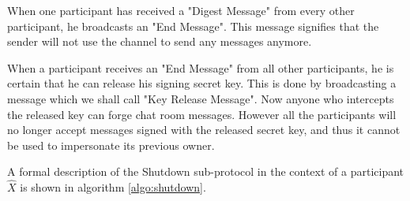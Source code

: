 When one participant has received a "Digest Message" from every other participant, he broadcasts an "End Message". This message signifies that the sender will not use the channel to send any messages anymore.

When a participant receives an "End Message" from all other participants, he is certain that he can release his signing secret key. This is done by broadcasting a message which we shall call "Key Release Message". Now anyone who intercepts the released key can forge chat room messages. However all the participants will no longer accept messages signed with the released secret key, and thus it cannot be used to impersonate its previous owner.

A formal description of the Shutdown sub-protocol in the context of a participant $\hat{X}$ is shown in algorithm \ref{algo:shutdown}.\\

